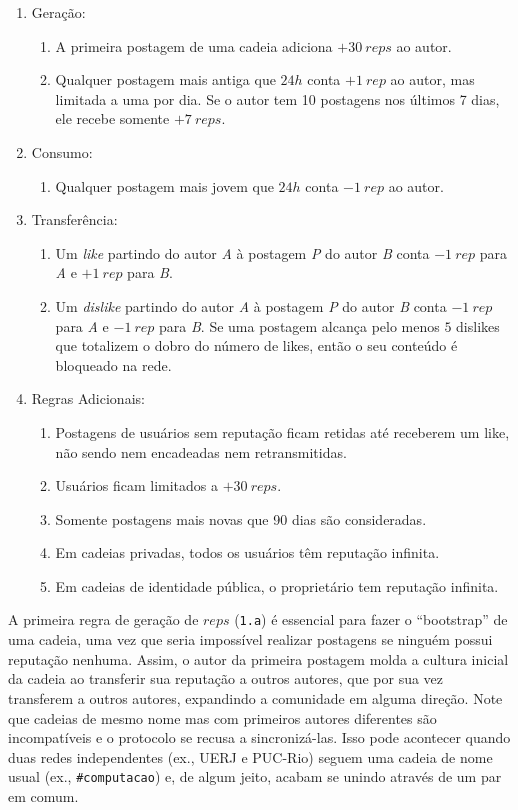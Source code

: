 \documentclass[12pt]{article}
\begin{document}
\begin{enumerate}
\item Geração:
    \begin{enumerate}
    \item A primeira postagem de uma cadeia adiciona $+30~reps$ ao autor.
    \item Qualquer postagem mais antiga que $24h$ conta $+1~rep$ ao autor, mas
          limitada a uma por dia. Se o autor tem 10 postagens nos últimos 7
          dias, ele recebe somente $+7~reps$.
    \end{enumerate}
\item Consumo:
    \begin{enumerate}
    \item Qualquer postagem mais jovem que $24h$ conta $-1~rep$ ao autor.
    \end{enumerate}
\item Transferência:
    \begin{enumerate}
    \item Um \emph{like}    partindo do autor \emph{A} à postagem \emph{P} do
          autor \emph{B} conta $-1~rep$ para \emph{A} e $+1~rep$ para \emph{B}.
    \item Um \emph{dislike} partindo do autor \emph{A} à postagem \emph{P} do
          autor \emph{B} conta $-1~rep$ para \emph{A} e $-1~rep$ para \emph{B}.
          Se uma postagem alcança pelo menos $5$ dislikes que totalizem o dobro
          do número de likes, então o seu conteúdo é bloqueado na rede.
    \end{enumerate}
\item Regras Adicionais:
    \begin{enumerate}
    \item Postagens de usuários sem reputação ficam retidas até receberem um
          like, não sendo nem encadeadas nem retransmitidas.
    \item Usuários ficam limitados a $+30~reps$.
    \item Somente postagens mais novas que 90 dias são consideradas.
    \item Em cadeias privadas, todos os usuários têm reputação infinita.
    \item Em cadeias de identidade pública, o proprietário tem reputação
          infinita.
    \end{enumerate}
\end{enumerate}
%
A primeira regra de geração de $reps$ (\texttt{1.a}) é essencial para fazer o
``bootstrap'' de uma cadeia, uma vez que seria impossível realizar postagens se
ninguém possui reputação nenhuma.
Assim, o autor da primeira postagem molda a cultura inicial da cadeia ao
transferir sua reputação a outros autores, que por sua vez transferem a outros
autores, expandindo a comunidade em alguma direção.
%
Note que cadeias de mesmo nome mas com primeiros autores diferentes são
incompatíveis e o protocolo se recusa a sincronizá-las.
Isso pode acontecer quando duas redes independentes (ex., UERJ e PUC-Rio)
seguem uma cadeia de nome usual (ex., \texttt{\#computacao}) e, de algum jeito,
acabam se unindo através de um par em comum.
\end{document}
